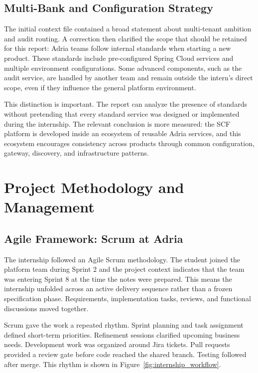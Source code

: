 \subsection{Multi-Bank and Configuration Strategy}
\label{subsec:multi_bank_strategy}

The initial context file contained a broad statement about multi-tenant ambition and audit routing. A correction then clarified the scope that should be retained for this report: Adria teams follow internal standards when starting a new product. These standards include pre-configured Spring Cloud services and multiple environment configurations. Some advanced components, such as the audit service, are handled by another team and remain outside the intern's direct scope, even if they influence the general platform environment.

This distinction is important. The report can analyze the presence of standards without pretending that every standard service was designed or implemented during the internship. The relevant conclusion is more measured: the SCF platform is developed inside an ecosystem of reusable Adria services, and this ecosystem encourages consistency across products through common configuration, gateway, discovery, and infrastructure patterns.

\section{Project Methodology and Management}
\label{sec:project_methodology}

\subsection{Agile Framework: Scrum at Adria}
\label{subsec:scrum_adria}

The internship followed an Agile Scrum methodology. The student joined the platform team during Sprint 2 and the project context indicates that the team was entering Sprint 8 at the time the notes were prepared. This means the internship unfolded across an active delivery sequence rather than a frozen specification phase. Requirements, implementation tasks, reviews, and functional discussions moved together.

Scrum gave the work a repeated rhythm. Sprint planning and task assignment defined short-term priorities. Refinement sessions clarified upcoming business needs. Development work was organized around Jira tickets. Pull requests provided a review gate before code reached the shared branch. Testing followed after merge. This rhythm is shown in Figure~\ref{fig:internship_workflow}.

